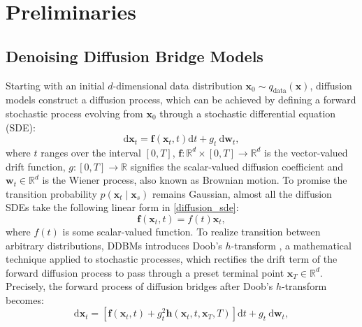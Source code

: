 \section{Preliminaries}

\subsection{Denoising Diffusion Bridge Models}

Starting with an initial $d$-dimensional data distribution $\mathbf{x}_0 \sim q_{\text{data}}(\mathbf{x})$, diffusion models \cite{song2021scorebasedgenerativemodelingstochastic, ho2020denoisingdiffusionprobabilisticmodels, sohldickstein2015deepunsupervisedlearningusing, song2020generativemodelingestimatinggradients} construct a diffusion process, which can be achieved by defining a forward stochastic process evolving from $\mathbf{x}_0$ through a stochastic differential equation (SDE):
\begin{equation}\label{diffusion_sde}
\mathrm{d} \mathbf{x}_t = \mathbf{f}(\mathbf{x}_t, t) \mathrm{d} t+g_t \mathrm{~d} \mathbf{w}_t,
\end{equation}
where $t$ ranges over the interval $[0, T]$, $\mathbf{f}: \mathbb{R}^d \times [0, T] \rightarrow \mathbb{R}^d$ is the vector-valued drift function, $g:[0, T] \rightarrow \mathbb{R}$ signifies the scalar-valued diffusion coefficient and $\mathbf{w}_t \in \mathbb{R}^d$ is the Wiener process, also known as Brownian motion. To promise the transition probability $p(\mathbf{x}_t \mid \mathbf{x}_s)$ remains Gaussian, almost all the diffusion SDEs take the following linear form \cite{zheng2024diffusionbridgeimplicitmodels} in \eqref{diffusion_sde}:
\begin{equation}\label{linear_form}
\mathbf{f}(\mathbf{x}_t, t) = f(t) \mathbf{x}_t,
\end{equation}
where $f(t)$ is some scalar-valued function. To realize transition between arbitrary distributions, DDBMs introduces Doob’s $h$-transform \cite{särkkä2019applied}, a mathematical technique applied to stochastic processes, which rectifies the drift term of the forward diffusion process to pass through a preset terminal point $\mathbf{x}_T \in \mathbb{R}^d$. Precisely, the forward process of diffusion bridges after Doob's $h$-transform becomes: 
\begin{equation}\label{doob}
\mathrm{d} \mathbf{x}_t = \left[ \mathbf{f}(\mathbf{x}_t, t) + g^2_t \mathbf{h}(\mathbf{x}_t, t, \mathbf{x}_T, T) \right] \mathrm{d} t+g_t \mathrm{~d} \mathbf{w}_t,
\end{equation}
